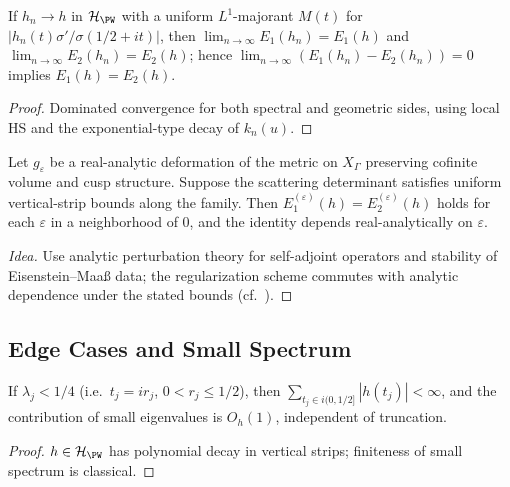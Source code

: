 \begin{proposition}\label{prop:PW-stability}\relax
If $h_n\to h$ in $\mathcal{H}_{\PW}$ with a uniform $L^1$-majorant $M(t)$ for $|h_n(t)\sigma'/\sigma(1/2+it)|$, then $\lim_{n\to\infty}E_1(h_n)=E_1(h)$ and $\lim_{n\to\infty}E_2(h_n)=E_2(h)$; hence $\lim_{n\to\infty}(E_1(h_n)-E_2(h_n))=0$ implies $E_1(h)=E_2(h)$. %
\end{proposition}

\begin{proof}\relax
Dominated convergence for both spectral and geometric sides, using local HS and the exponential-type decay of $k_n(u)$. %
\end{proof}

\begin{proposition}\label{prop:deformation}\relax
Let $g_\varepsilon$ be a real-analytic deformation of the metric on $X_\Gamma$ preserving cofinite volume and cusp structure. Suppose the scattering determinant satisfies uniform vertical-strip bounds along the family. Then $E_1^{(\varepsilon)}(h)=E_2^{(\varepsilon)}(h)$ holds for each $\varepsilon$ in a neighborhood of $0$, and the identity depends real-analytically on $\varepsilon$. %
\end{proposition}

\begin{proof}[Idea]\relax
Use analytic perturbation theory for self-adjoint operators and stability of Eisenstein–Maaß data; the regularization scheme commutes with analytic dependence under the stated bounds (cf.\ \cite{Borthwick2020}). %
\end{proof}

\subsection{Edge Cases and Small Spectrum}\relax\hspace{0pt}
\label{subsec:edge-small}\relax\hspace{0pt}

\begin{lemma}\label{lem:small-spec}\relax
If $\lambda_j<1/4$ (i.e.\ $t_j=i r_j$, $0< r_j\le 1/2$), then $\sum_{t_j\in i(0,1/2]}\!\!|h(t_j)|<\infty$, and the contribution of small eigenvalues is $O_h(1)$, independent of truncation. %
\end{lemma}

\begin{proof}\relax
$h\in\mathcal{H}_{\PW}$ has polynomial decay in vertical strips; finiteness of small spectrum is classical. %
\end{proof}

